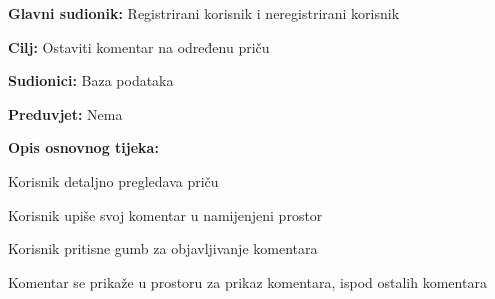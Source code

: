 					\noindent {}
					\begin{packed_item}
						
						\item \textbf{Glavni sudionik: }Registrirani korisnik i neregistrirani korisnik
						\item  \textbf{Cilj:} Ostaviti komentar na određenu priču
						\item  \textbf{Sudionici:} Baza podataka
						\item  \textbf{Preduvjet:} Nema
						\item  \textbf{Opis osnovnog tijeka:}
						
						\item[] \begin{packed_enum}
							\item Korisnik detaljno pregledava priču
							\item Korisnik upiše svoj komentar u namijenjeni prostor
							\item Korisnik pritisne gumb za objavljivanje komentara
							\item Komentar se prikaže u prostoru za prikaz komentara, ispod ostalih komentara
						\end{packed_enum}
						
					\end{packed_item}
					
